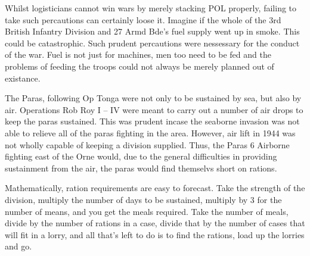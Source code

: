 \documentclass[noraggedright]{turabian-researchpaper}
\begin{document}

Whilst logisticians cannot win wars by merely stacking POL properly, failing
to take such percautions can certainly loose it.  Imagine if the whole of
the 3rd British Infantry Division and 27 Armd Bde's fuel supply went up in
smoke.  This could be catastrophic.  Such prudent percautions were nessessary
for the conduct of the war.  Fuel is not just for machines, men too need to be
fed and the problems of feeding the troops could not always be merely planned
out of existance.

The Paras, following Op Tonga were not only to be sustained by sea, but also
by air.  Operations Rob Roy I -- IV were meant to carry out a number of air
drops to keep the paras sustained.  This was prudent incase the seaborne 
invasion was not able to relieve all of the paras fighting in the area.  
However, air lift in 1944 was not wholly capable of keeping a division 
supplied.  Thus, the Paras 6 Airborne fighting east of the 
Orne would, due to the general difficulties in providing sustainment from 
the air, the paras would find themselvs short on rations.

Mathematically, ration requirements are easy to forecast.  Take the strength
of the division, multiply the number of days to be sustained, multiply by
3 for the number of means, and you get the meals required.  Take the number of 
meals, divide by the number of rations in a case, divide that by the number 
of cases that will fit in a lorry, and all that's left to do is to find the 
rations, load up the lorries and go.  
\end{document}
